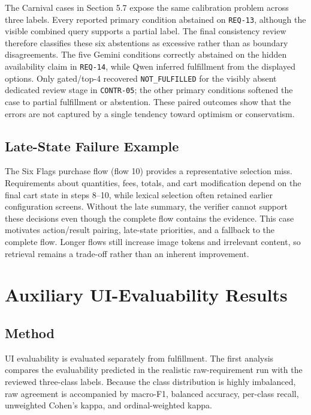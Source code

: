 The Carnival cases in Section 5.7 expose the same calibration problem across
three labels. Every reported primary condition abstained on \texttt{REQ-13}, although
the visible combined query supports a partial label. The final consistency
review therefore classifies these six abstentions as excessive rather than as
boundary disagreements. The five Gemini conditions
correctly abstained on the hidden availability claim in \texttt{REQ-14}, while Qwen
inferred fulfillment from the displayed options. Only gated/top-4 recovered
\texttt{NOT\_FULFILLED} for the visibly absent dedicated review stage in \texttt{CONTR-05};
the other primary conditions softened the case to partial fulfillment or
abstention. These paired outcomes show that the errors are not captured by a
single tendency toward optimism or conservatism.

\subsection{Late-State Failure Example}\label{late-state-failure-example}

The Six Flags purchase flow (flow 10) provides a representative selection miss.
Requirements about quantities, fees, totals, and cart modification depend on
the final cart state in steps 8--10, while lexical selection often retained
earlier configuration screens. Without the late summary, the verifier cannot
support these decisions even though the complete flow contains the evidence.
This case motivates action/result pairing, late-state priorities, and a fallback
to the complete flow. Longer flows still increase image tokens and irrelevant
content, so retrieval remains a trade-off rather than an inherent improvement.

\section{Auxiliary UI-Evaluability Results}\label{auxiliary-ui-evaluability-results}

\subsection{Method}\label{method}

UI evaluability is evaluated separately from fulfillment. The first analysis
compares the evaluability predicted in the realistic raw-requirement run with
the reviewed three-class labels. Because the class distribution is highly
imbalanced, raw agreement is accompanied by macro-F1, balanced accuracy,
per-class recall, unweighted Cohen's kappa, and ordinal-weighted kappa.

